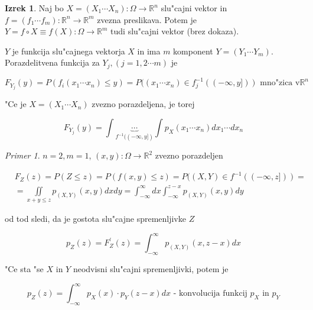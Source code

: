 \documentclass[a4paper,12pt]{article}
\theoremstyle{definition}
\newtheorem{theorem}[counter]{Izrek}
\theoremstyle{remark}
\newtheorem*{ex}{Primer}
\newcommand{\R}{\mathbb{R}}
\begin{document}
\begin{theorem}
    Naj bo $X = (X_1 \cdots X_n): \Omega \to \R^n$ slu"cajni vektor in $f = (f_1 \cdots f_m): \R^n \to \R^m$ zvezna
    preslikava. Potem je $Y = f \circ X \equiv f(X): \Omega \to \R^m$ tudi slu"cajni vektor (brez dokaza).
\end{theorem}

$Y$ je funkcija slu"cajnega vektorja $X$ in ima $m$ komponent $Y = (Y_1 \cdots Y_m)$. \\
Porazdelitvena funkcija za $Y_j, (j = 1, 2 \cdots m)$ je

\begin{equation*}
    F_{Y_j}(y) = P(f_i(x_1 \cdots x_n) \leq y) = P((x_1 \cdots x_n) \in f_j^{-1}((-\infty, y])) \text{ mno"zica v} \R^n
\end{equation*}

"Ce je $X = (X_1 \cdots X_n)$ zvezno porazdeljena, je torej

\begin{equation*}
    F_{Y_j}(y) = \int \underbrace{\cdots}_{f^{-1}((-\infty, y])} \int p_X(x_1 \cdots x_n) dx_1 \cdots dx_n
\end{equation*}

\begin{ex}
    $n = 2, m = 1$, $(x,y): \Omega \to \R^2$ zvezno porazdeljen

    \begin{align*}
        &F_Z(z) = P(Z \leq z) = P(f(x,y) \leq z) = P((X,Y) \in f^{-1}((-\infty, z])) = \\
        &= \iint\limits_{x + y \leq z} p_{(X,Y)}(x,y) dx dy = \int_{-\infty}^{\infty} dx
            \int_{-\infty}^{z-x} p_{(X,Y)}(x,y) dy
    \end{align*}

    od tod sledi, da je gostota slu"cajne spremenljivke $Z$

    \begin{equation*}
        p_Z(z) = F_Z^{'}(z) = \int_{-\infty}^{\infty} p_{(X,Y)}(x,z-x) dx
    \end{equation*}

    "Ce sta "se $X$ in $Y$ neodvisni slu"cajni spremenljivki, potem je

    \begin{equation*}
        p_Z(z) = \int_{-\infty}^{\infty} p_X(x) \cdot p_Y(z-x) dx \text{ - konvolucija funkcij } p_X \text{ in } p_Y
    \end{equation*}
\end{ex}
\end{document}
